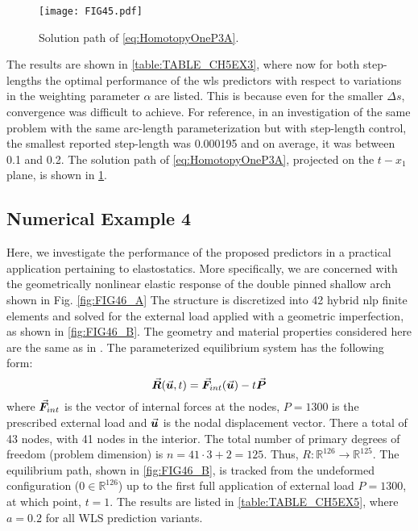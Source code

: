 \begin{figure}[b!]
	\centering
	\texttt{[image: FIG45.pdf]}
	\caption{Solution path of \ref{eq:HomotopyOneP3A}.}
	\label{fig:FIG45}
\end{figure}

The results are shown in \ref{table:TABLE_CH5EX3}, where now for both 
step-lengths
the optimal performance of the \acrshort{wls} predictors with respect to 
variations in 
the weighting parameter $\alpha$ are listed. This is because even for the 
smaller $\Delta s$, convergence was difficult to achieve. For reference, in an
investigation\cite{Georg81} of the same problem with the same arc-length
parameterization but with step-length control, the smallest reported step-length
was 0.000195 and on average, it was between 0.1 and 0.2. The solution
path of \ref{eq:HomotopyOneP3A}, projected on the $t-x_1$
plane, is shown in \ref{fig:FIG45}.


\subsection{Numerical Example 4}
Here, we investigate the performance of the proposed predictors in a
practical application pertaining to elastostatics. More specifically, we are
concerned with the geometrically nonlinear elastic response of the double pinned
shallow arch shown in Fig. \ref{fig:FIG46_A} The structure is
discretized into 42 hybrid \acrshort{nlp} finite elements and solved for the 
external load
applied with a geometric imperfection, as shown in \ref{fig:FIG46_B}. The 
geometry and material properties 
considered here are the same as in \cite{Clarke:1990}. The parameterized 
equilibrium system has the following form:
\begin{equation}
	\vec{\bm{R}}(\vec{\bm{u}},t)=\vec{\bm{F}}_{int}(\vec{\bm{u}})-t \vec{\bm{P}}
	\label{eq:P4}
\end{equation}
where $\vec{\bm{F}}_{int}$ is the vector of internal forces at the nodes, $P=1300$ 
is the
prescribed external load and $\vec{\bm{u}}$ is the nodal
displacement vector. There a total of 43 nodes, with 41 nodes in the interior. 
The total number of primary degrees of
freedom (problem dimension) is $n=41\cdot 3+2=125$. Thus,
$R:\mathbb{R}^{126}\rightarrow\mathbb{R}^{125}$. The equilibrium path, shown in
\ref{fig:FIG46_B}, is tracked from
the undeformed configuration ($0\in\mathbb{R}^{126}$) up to the first full 
application of external load $P=1300$, at which point, $t=1$. The results are
listed in \ref{table:TABLE_CH5EX5}, where $a=0.2$ for all WLS prediction 
variants. 

